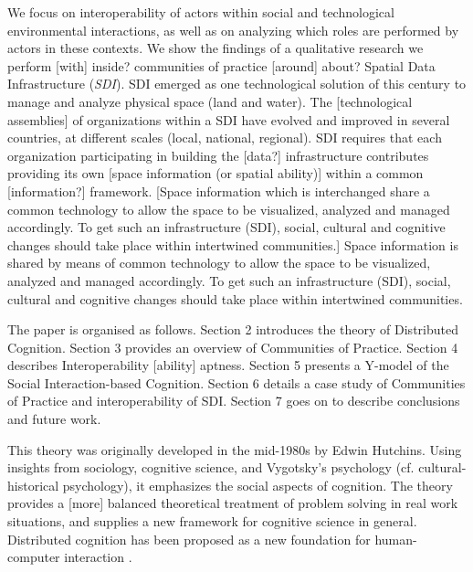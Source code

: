 \documentclass[10pt,twocolumn,ieeetran]{article}
\newcommand{\nota}[1]{{\color{red}[#1]}}
\begin{document}
We focus on interoperability of actors within social and technological environmental interactions, as well as on analyzing which roles are performed by actors in these contexts. We show the findings of a qualitative 
research we perform \nota{with} inside? communities of practice \nota{around} about? Spatial Data Infrastructure ({\it SDI}). SDI emerged
as one technological solution of this century to manage and analyze physical space (land and water). 
The \nota{technological assemblies} of organizations within a SDI have evolved and improved in several countries, at different scales (local, national, regional). SDI requires that each organization participating in building the \nota{data?} infrastructure contributes providing its own \nota{space information (or spatial ability)} within a common \nota{information?} framework. \nota{Space information which is interchanged share a common technology to allow the space to be visualized, analyzed and managed accordingly. To get such an infrastructure (SDI), social, cultural \cite{Nisbett} and cognitive changes should take place within intertwined communities.}
Space information is shared by means of common technology to allow the space to be visualized, analyzed and managed accordingly. To get such an infrastructure (SDI), social, cultural \cite{Nisbett} and cognitive changes should take place within intertwined communities.



           
The paper is organised as follows. Section 2 introduces the theory of Distributed Cognition. 
Section 3 provides an overview of Communities of Practice. Section 4 describes Interoperability \nota{ability} aptness. Section 5 presents a Y-model of the Social Interaction-based Cognition. 
Section 6 details a case study of Communities of Practice and interoperability of SDI. 
Section 7 goes on to describe conclusions and future work.
                                       
                                                     

This theory was originally developed in the mid-1980s by Edwin Hutchins. Using insights from sociology, cognitive science, and Vygotsky's psychology  (cf. cultural-historical psychology), it emphasizes the social aspects of cognition. The theory provides a \nota{more} balanced theoretical treatment of problem solving in real work situations, and supplies a new framework for cognitive science in general.
Distributed cognition has been proposed as a new foundation for human-computer interaction \cite{Hollan}. 
\end{document}
